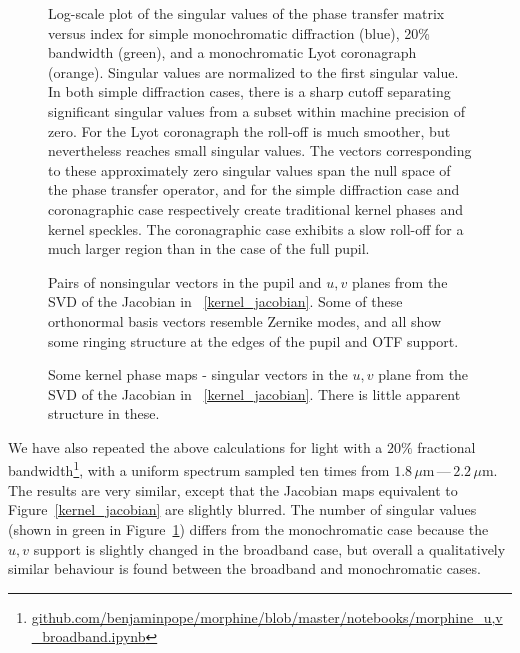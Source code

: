 \documentclass[modern]{aastex63}
\begin{document}
\begin{figure}
     \caption{Log-scale plot of the singular values of the phase transfer matrix versus index for simple monochromatic diffraction (blue), 20\% bandwidth (green), and a monochromatic Lyot coronagraph (orange). Singular values are normalized to the first singular value. In both simple diffraction cases, there is a sharp cutoff separating significant singular values from a subset within machine precision of zero. For the Lyot coronagraph the roll-off is much smoother, but nevertheless reaches small singular values. The vectors corresponding to these approximately zero singular values span the null space of the phase transfer operator, and for the simple diffraction case and coronagraphic case respectively create traditional kernel phases and kernel speckles. The coronagraphic case  exhibits a slow roll-off for a much larger region than in the case of the full pupil. }
    \label{fig:svd}
\end{figure}

\begin{figure}
\caption{Pairs of nonsingular vectors in the pupil and $u,v$ planes from the SVD of the Jacobian in ~\ref{kernel_jacobian}. Some of these orthonormal basis vectors resemble Zernike modes, and all show some ringing structure at the edges of the pupil and OTF support.
\label{nonsingular_modes}}
\end{figure}

\begin{figure}
\caption{Some kernel phase maps - singular vectors in the $u,v$ plane from the SVD of the Jacobian in ~\ref{kernel_jacobian}. There is little apparent structure in these.
\label{kernel_modes}}
\end{figure}

We have also repeated the above calculations for light with a $20\%$ fractional bandwidth\footnote{\href{https://github.com/benjaminpope/morphine/blob/master/notebooks/morphine_u,v_broadband.ipynb}{github.com/benjaminpope/morphine/blob/master/notebooks/morphine\_u,v\_broadband.ipynb}}, with a uniform spectrum sampled ten times from $1.8\,\mu\text{m}$\,---\,$2.2\,\mu\text{m}$. The results are very similar, except that the Jacobian maps equivalent to Figure~\ref{kernel_jacobian} are slightly blurred. The number of singular values (shown in green in Figure~\ref{fig:svd}) differs from the monochromatic case because the $u,v$ support is slightly changed in the broadband case, but overall a qualitatively similar behaviour is found between the broadband and monochromatic cases. 
\end{document}
